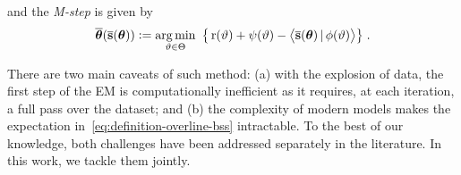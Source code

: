 \documentclass[12pt]{article}
\begin{document}
and the \textit{M-step} is given by
\begin{align}\label{eq:mstep}
\overline{{\bm{\theta}}}( \overline{{\mathbf{s}}}({\bm{\theta}}) ) \mathrel{\mathop:}= \mathop{\mathrm{arg\,min}}_{ \vartheta \in \Theta } ~\big\{ \operatorname{r}( \vartheta ) + \psi( \vartheta) - \big\langle \overline{{\mathbf{s}}}({\bm{\theta}})\,|\, \phi ( \vartheta)  \big\rangle \big\} \;.
\end{align}


There are two main caveats of such method: {(a)} with the explosion of data, the first step of the EM is computationally inefficient as it requires, at each iteration, a full pass over the dataset; and {(b)} the complexity of modern models makes the expectation in~\eqref{eq:definition-overline-bss} intractable. 
To the best of our knowledge, both challenges have been addressed separately in the literature. 
In this work, we tackle them jointly.
\end{document}
